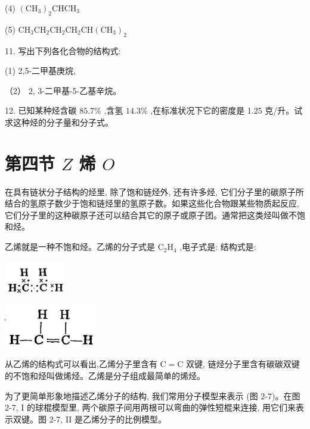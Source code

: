 \documentclass[10pt]{article}
\newcommand{\customfootnote}[1]{
  \let\thefootnote\relax\footnotetext{#1}
}
\begin{document}
(4) \({\left( {\mathrm{{CH}}}_{3}\right) }_{2}{\mathrm{{CHCH}}}_{3}\)

(5) \({\mathrm{{CH}}}_{3}{\mathrm{{CH}}}_{2}{\mathrm{{CH}}}_{2}{\mathrm{{CH}}}_{2}\mathrm{{CH}}{\left( {\mathrm{{CH}}}_{3}\right) }_{2}\)

11. 写出下列各化合物的结构式:

(1) 2,5-二甲基庚烷,

（2） 2, 3-二甲基-5-乙基辛烷。

12. 已知某种烃含碳 \({85.7}\%\) ,含氢 \({14.3}\%\) ,在标准状况下它的密度是 1.25 克/升。试求这种烃的分子量和分子式。

\section*{第四节 \(Z\) 烯 \(O\)}

在具有链状分子结构的烃里, 除了饱和链烃外, 还有许多烃, 它们分子里的碳原子所结合的氢原子数少于饱和链烃里的氢原子数。如果这些化合物跟某些物质起反应, 它们分子里的这种碳原子还可以结合其它的原子或原子团。通常把这类烃叫做不饱和烃。

\customfootnote{

① 烯音 xi。

}

乙烯就是一种不饱和烃。乙烯的分子式是 \({\mathrm{C}}_{2}{\mathrm{H}}_{4}\) ,电子式是: 结构式是:

\begin{center}
\includegraphics[max width=0.2\textwidth]{images/01912d16-be99-77bb-9535-4f3ed8d9946f_68_704159.jpg}
\end{center}

\begin{center}
\includegraphics[max width=0.3\textwidth]{images/01912d16-be99-77bb-9535-4f3ed8d9946f_68_108669.jpg}
\end{center}

从乙烯的结构式可以看出,乙烯分子里含有 \(\mathrm{C} = \mathrm{C}\) 双键, 链烃分子里含有碳碳双键的不饱和烃叫做烯烃。乙烯是分子组成最简单的烯烃。

为了更简单形象地描述乙烯分子的结构, 我们常用分子模型来表示 (图 2-7)。在图 2-7, I 的球棍模型里, 两个碳原子间用两根可以弯曲的弹性短棍来连接, 用它们来表示双键。图 2-7, II 是乙烯分子的比例模型。
\end{document}
